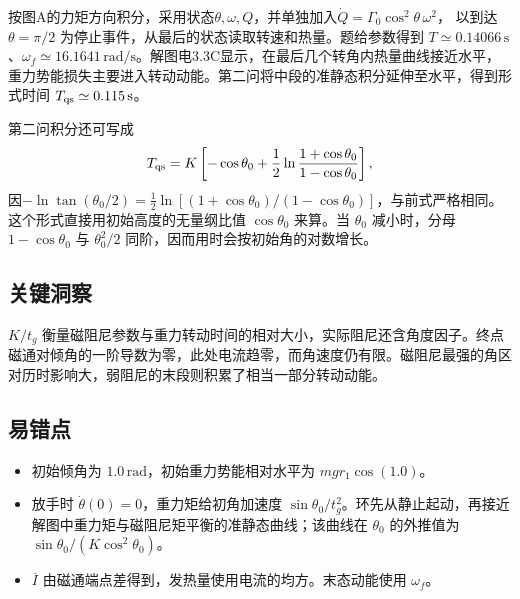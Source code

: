 \documentclass[UTF8,fontset=fandol,a4paper,11pt]{ctexart}
\begin{document}
按图A的力矩方向积分，采用状态$\theta,\omega,Q$，并单独加入$\dot Q=\Gamma_0\cos^2\theta\,\omega^2$，
以到达 $\theta=\pi/2$ 为停止事件，从最后的状态读取转速和热量。题给参数得到 $T\simeq0.14066\,\mathrm s$、$\omega_f\simeq16.1641\,\mathrm{rad/s}$。解图电3.3C显示，在最后几个转角内热量曲线接近水平，重力势能损失主要进入转动动能。第二问将中段的准静态积分延伸至水平，得到形式时间 $T_{\rm qs}\simeq0.115\,\mathrm s$。

第二问积分还可写成
\[
T_{\rm qs}=K\left[-\cos\theta_0+\frac12\ln\frac{1+\cos\theta_0}{1-\cos\theta_0}\right],
\]
因$-\ln\tan(\theta_0/2)=\tfrac12\ln[(1+\cos\theta_0)/(1-\cos\theta_0)]$，与前式严格相同。
这个形式直接用初始高度的无量纲比值 $\cos\theta_0$ 来算。当 $\theta_0$ 减小时，分母 $1-\cos\theta_0$ 与 $\theta_0^2/2$ 同阶，因而用时会按初始角的对数增长。




\subsection*{关键洞察}

$K/t_g$ 衡量磁阻尼参数与重力转动时间的相对大小，实际阻尼还含角度因子。终点磁通对倾角的一阶导数为零，此处电流趋零，而角速度仍有限。磁阻尼最强的角区对历时影响大，弱阻尼的末段则积累了相当一部分转动动能。



\subsection*{易错点}

\begin{itemize}
\item 初始倾角为 $1.0\,\mathrm{rad}$，初始重力势能相对水平为 $mg r_1\cos(1.0)$。
\item 放手时 $\dot\theta(0)=0$，重力矩给初角加速度 $\sin\theta_0/t_g^2$。环先从静止起动，再接近解图中重力矩与磁阻尼矩平衡的准静态曲线；该曲线在 $\theta_0$ 的外推值为 $\sin\theta_0/(K\cos^2\theta_0)$。
\item $\overline I$ 由磁通端点差得到，发热量使用电流的均方。末态动能使用 $\omega_f$。
\end{itemize}


\end{document}
